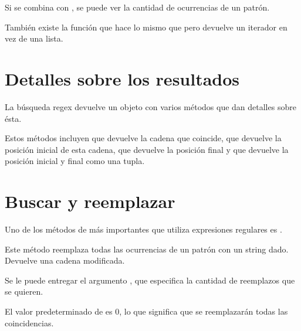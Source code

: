 
Si se combina  con , se puede ver la cantidad de ocurrencias de un patrón.


También existe la función  que hace lo mismo que  pero devuelve un iterador en vez de una lista.


\section{Detalles sobre los resultados}

La búsqueda regex devuelve un objeto con varios métodos que dan detalles sobre ésta.\smallskip

Estos métodos incluyen  que devuelve la cadena que coincide,  que devuelve la posición inicial de esta cadena,  que devuelve la posición final y  que devuelve la posición inicial y final como una tupla.


\section{Buscar y reemplazar}

Uno de los métodos de  más importantes que utiliza expresiones regulares es .\smallskip

Este método reemplaza todas las ocurrencias de un patrón con un string dado. Devuelve una cadena modificada.


Se le puede entregar el argumento , que especifica la cantidad de reemplazos que se quieren.


El valor predeterminado de  es 0, lo que significa que se reemplazarán todas las coincidencias.


